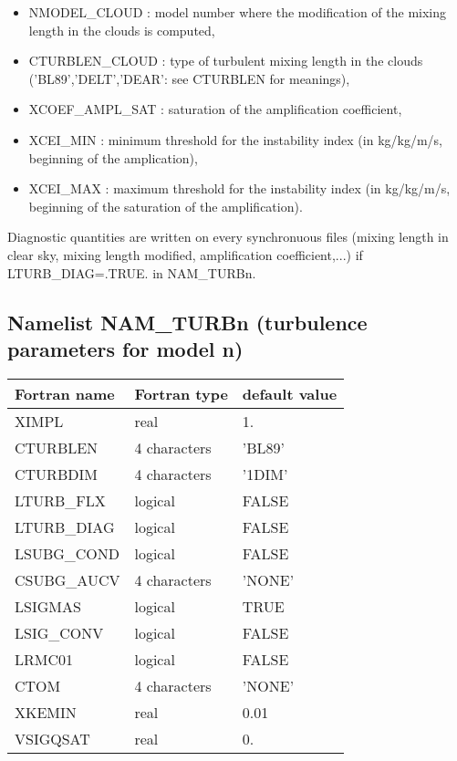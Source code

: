 \begin{itemize}
\item NMODEL\_CLOUD :
model number where the modification of the mixing length in the clouds is
computed,
\item CTURBLEN\_CLOUD :
type of turbulent mixing length in the clouds
 ('BL89','DELT','DEAR': see CTURBLEN for meanings),
\item XCOEF\_AMPL\_SAT :
saturation of the amplification coefficient,
\item XCEI\_MIN :
minimum threshold for the instability index (in kg/kg/m/s,
 beginning of the amplication),
\item XCEI\_MAX :
maximum threshold for the instability index (in kg/kg/m/s,
 beginning of the saturation of the amplification).
\end{itemize}
Diagnostic quantities are written on every synchronuous files 
(mixing length in clear sky, mixing length modified, amplification coefficient,...) if LTURB\_DIAG=.TRUE. in NAM\_TURBn.
\subsection{Namelist NAM\_TURBn (turbulence parameters for model n)}

\begin{center}
\begin{tabular} {|l|l|l|}
\hline
Fortran name & Fortran type & default value \\
\hline
XIMPL       &  real          & 1.     \\
CTURBLEN    &  4 characters  & 'BL89'   \\
CTURBDIM    &  4 characters  & '1DIM'   \\
LTURB\_FLX  &  logical       & FALSE  \\
LTURB\_DIAG &  logical       & FALSE  \\
LSUBG\_COND &  logical       & FALSE  \\
CSUBG\_AUCV &  4 characters  & 'NONE' \\
LSIGMAS     &  logical       & TRUE   \\
LSIG\_CONV  &  logical       & FALSE   \\
LRMC01      &  logical       & FALSE  \\
CTOM        &  4 characters  & 'NONE'   \\
XKEMIN      &  real          & 0.01 \\
VSIGQSAT    & real           & 0. \\
\hline
\end{tabular}
\end{center}

